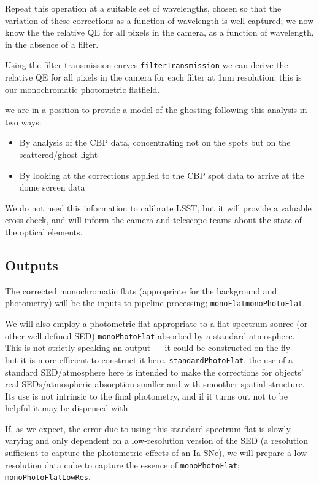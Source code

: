 \documentclass[DM,authoryear,toc,lsstdraft]{lsstdoc}
\newcommand{\inputData}[1]{\texttt{#1}}
\newcommand{\outputData}[1]{\texttt{#1}}
\newcommand{\outputDataII}[2]{\texttt{#1}\texttt{#2}}
\begin{document}
\begin{itemize}
Repeat this operation at a suitable set of wavelengths, chosen so that the variation of these corrections as
a function of wavelength is well captured; we now know the the relative QE for all pixels in the camera, as
a function of wavelength, in the absence of a filter.

Using the filter transmission curves \inputData{filterTransmission} we can derive the relative QE for all
pixels in the camera for each filter at 1nm resolution; this is our monochromatic photometric flatfield.

\Nb we are in a position to provide a model of the ghosting following this analysis in two ways:
\begin{itemize}
\item By analysis of the CBP data, concentrating not on the spots but on the scattered/ghost light
\item By looking at the corrections applied to the CBP spot data to arrive at the dome screen data
\end{itemize}
We do not need this information to calibrate LSST, but it will provide a valuable cross-check, and
will inform the camera and telescope teams about the state of the optical elements.

\subsection{Outputs}

The corrected monochromatic flats (appropriate for the background and photometry) will be the inputs to
pipeline processing; \outputDataII{monoFlat}{monoPhotoFlat}.

We will also employ a photometric flat appropriate to a flat-spectrum source (or other well-defined SED)
\outputData{monoPhotoFlat} absorbed by a standard atmosphere.  This is not strictly-speaking an output --- it
could be constructed on the fly --- but it is more efficient to construct it here.
\outputData{standardPhotoFlat}.  \Nb the use of a standard SED/atmosphere here is intended to make the
corrections for objects' real SEDs/atmospheric absorption smaller and with smoother spatial structure.
Its use is not intrinsic to the final photometry, and if it turns out not to be helpful it may be
dispensed with.

If, as we expect, the error due to using this standard spectrum flat is slowly varying and only dependent on a
low-resolution version of the SED (\eg a resolution sufficient to capture the photometric effects of an Ia
SNe), we will prepare a low-resolution data cube to capture the essence of \outputData{monoPhotoFlat};
\outputData{monoPhotoFlatLowRes}.

\end{itemize}
\end{document}
